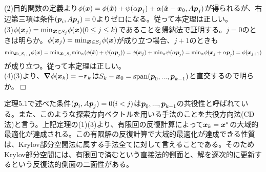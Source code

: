 \documentclass[dvipdfmx, 9pt, a4paper]{jsarticle}
\numberwithin{equation}{subsection}
\newcommand{\bm}[1]{{\mbox{\boldmath $#1$}}}
\newcommand{\bnabla}{\bm \nabla}
\def\qed{\hfill $\Box$}
\begin{document}
(2)目的関数の定義より$\phi(\bm x)=\phi(\hat{\bm x})+\psi(\alpha \bm p_j)+\alpha(\hat{\bm x}-\bm x_0, A\bm p_j)$が得られるが、右辺第三項は条件$(\bm p_i, A\bm p_j)=0$よりゼロになる。従って本定理は正しい。\\
(3)$\phi(\bm x_j)={\rm min}_{\bm x \in S_j}\phi(\bm x)(0 \leq j \leq k)$であることを帰納法で証明する。$j=0$のときは明らか。$\phi(\bm x_j)={\rm min}_{\bm x \in S_j}\phi(\bm x)$が成り立つ場合、$j+1$のときも
\begin{equation}
{\rm min}_{\bm x \in S_{j+1}}\phi(\bm x)={\rm min}_{\bm x \in S_j}{\rm min}_{\alpha}(\phi(\hat{\bm x})+\psi(\alpha \bm p_j))=\phi(\bm x_j)+{\rm min}_\alpha \psi(\alpha \bm p_j)={\rm min}_\alpha\phi(\bm x_j+\alpha \bm p_j)=\phi(\bm x_{j+1}) \notag
\end{equation}
が成り立つ。従って本定理は正しい。\\
(4)(3)より、$\bnabla \phi(\bm x_k)=-\bm r_k$は$S_k-\bm x_0={\rm span}(\bm p_0, ..., \bm p_{k-1})$と直交するので明らか。\qed \par
定理5.1で述べた条件$(\bm p_i, A\bm p_j)=0(i<j)$は$\bm p_0, ..., \bm p_{k-1}$の共役性と呼ばれている。また、このような探索方向ベクトルを用いる手法のことを共役方向法(CD法)と言う。上記定理の(1)(3)より、有限回の反復計算によって$\bm x_k=\bm x^*$の大域的最適化が達成される。この有限解の反復計算で大域的最適化が達成できる性質は、Krylov部分空間法に属する手法全てに対して言えることである。そのためKrylov部分空間には、有限回で済むという直接法的側面と、解を逐次的に更新するという反復法的側面の二面性がある。
\end{document}
